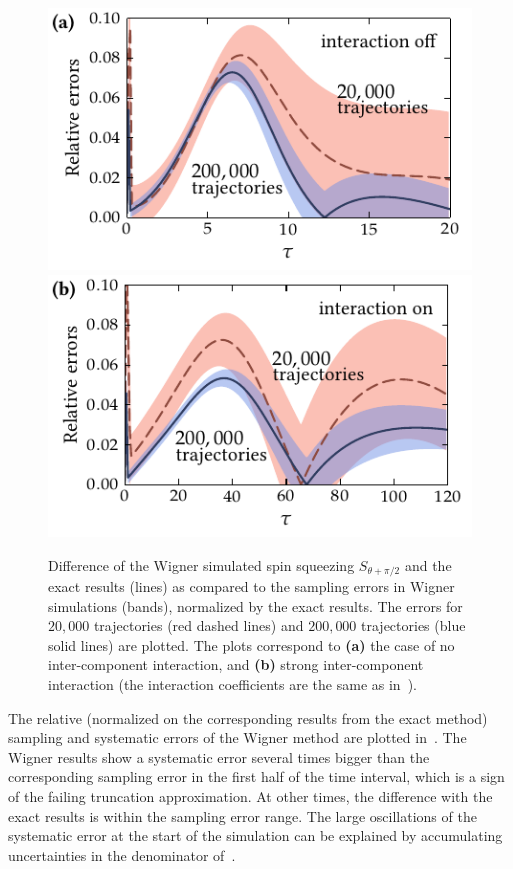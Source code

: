 \begin{figure}
    \centerline{%
    \includegraphics{figures_generated/exact/squeezing_nocc_err.pdf}%
    \includegraphics{figures_generated/exact/squeezing_cc_err.pdf}}

    \caption[Sampling and systematic errors in Wigner simulated spin squeezing]{
    Difference of the Wigner simulated spin squeezing $S_{\theta+\pi/2}$ and the exact results (lines) as compared to the sampling errors in Wigner simulations (bands), normalized by the exact results.
    The errors for $20,000$ trajectories (red dashed lines) and $200,000$ trajectories (blue solid lines) are plotted.
    The plots correspond to \textbf{(a)} the case of no inter-component interaction, and \textbf{(b)} strong inter-component interaction (the interaction coefficients are the same as in~).}%

    \label{fig:exact:squeezing-error-comparison}
\end{figure}

The relative (normalized on the corresponding results from the exact method) sampling and systematic errors of the Wigner method are plotted in~.
The Wigner results show a systematic error several times bigger than the corresponding sampling error in the first half of the time interval, which is a sign of the failing truncation approximation.
At other times, the difference with the exact results is within the sampling error range.
The large oscillations of the systematic error at the start of the simulation can be explained by accumulating uncertainties in the denominator of~.

